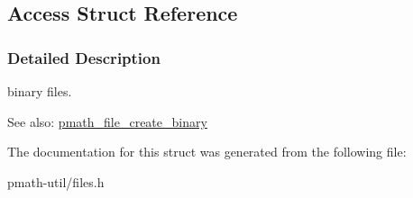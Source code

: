 \hypertarget{struct_access}{
\subsection{Access Struct Reference}
\label{struct_access}
}


\subsubsection{Detailed Description}
binary files.

\begin{Desc}
\item[See also:]\hyperlink{group__file__api_gc516c23ea420e00128dca9b5dd56eea2}{pmath\_\-file\_\-create\_\-binary} \end{Desc}


The documentation for this struct was generated from the following file:\begin{CompactItemize}
\item 
pmath-util/files.h\end{CompactItemize}
